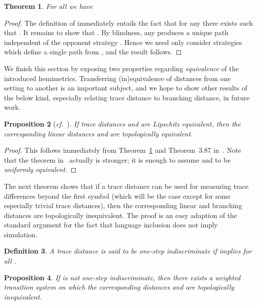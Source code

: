 \documentclass[copyright,creativecommons,sharealike]{eptcs}
\theoremstyle{plain}
\newtheorem{theorem}{Theorem}
\newtheorem{definition}[theorem]{Definition}
\newtheorem{proposition}[theorem]{Proposition}
\newcommand*\cf{\textit{cf.}}
\begin{document}
\begin{theorem}
  \label{thm:dl-formula}
  For all  we have
  
\end{theorem}

\begin{proof}
  The definition of  immediately entails the fact that
  for any  there exists  such that
  . It remains to show
  that .
  By blindness, any  produces a unique path
   independent of the opponent strategy
  .  Hence we need only consider strategies
   which define a single path  from , and the
  result follows.
\end{proof}

We finish this section by exposing two properties regarding
\emph{equivalence} of the introduced hemimetrics.  Transferring
(in)equivalence of distances from one setting to another is an
important subject, and we hope to show other results of the below
kind, especially relating trace distance to branching distance, in
future work.

\begin{proposition}[\cf~{\cite[Thm.~3.87]{aliprantis2007infinite}}]
  If trace distances  and  are Lipschitz equivalent,
  then the corresponding linear distances  and  are
  topologically equivalent.
\end{proposition}

\begin{proof}
  This follows immediately from Theorem~\ref{thm:dl-formula} and
  Theorem~3.87 in~\cite{aliprantis2007infinite}.  Note that the
  theorem in~\cite{aliprantis2007infinite} actually is stronger; it is
  enough to assume  and  to be \emph{uniformly
    equivalent}.
\end{proof}

The next theorem shows that if a trace distance can be used for
measuring trace differences beyond the first symbol (which will be the
case except for some especially trivial trace distances), then the
corresponding linear and branching distances are topologically
inequivalent.  The proof is an easy adaption of the standard argument
for the fact that language inclusion does not imply simulation.

\begin{definition}
  A trace distance  is said to be
  \emph{one-step indiscriminate} if  implies  for all .
\end{definition}

\begin{proposition}
  \label{pr:wts-ineq}
  If  is not one-step indiscriminate, then there exists a
  weighted transition system  on which the corresponding distances
   and  are topologically inequivalent.
\end{proposition}
\end{document}
